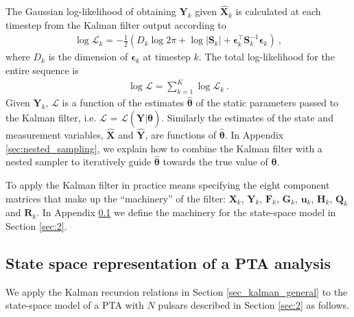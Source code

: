 \documentclass[fleqn,usenatbib,useAMS]{mnras}
\begin{document}
The Gaussian log-likelihood of obtaining ${\boldsymbol{Y}}_k$ given ${\boldsymbol{\hat X}}_k$ is calculated at each timestep from the Kalman filter output according to \citep{zarchan2000fundamentals}
\begin{eqnarray}
	\log \mathcal{L}_k =  -\frac{1}{2} \left (D_k \log 2 \pi + \log  \left | \boldsymbol{S}_k \right | + \boldsymbol{\epsilon}_k^{\intercal} \boldsymbol{S}_k^{-1}  \boldsymbol{\epsilon}_k \right ) \ ,
\end{eqnarray}
where $D_k$ is the dimension of $\boldsymbol{\epsilon}_k$ at timestep $k$. The total log-likelihood for the entire sequence is
\begin{eqnarray}
	\log \mathcal{L} =  \sum_{k=1}^{K} \log \mathcal{L}_k \ . \label{eq:likelihood}
\end{eqnarray}
Given ${\boldsymbol{Y}}_k$, $\mathcal{L}$ is a function of the estimates ${\boldsymbol{\hat \theta}}$ of the static parameters passed to the Kalman filter, i.e. $\mathcal{L}$ = $\mathcal{L}(\boldsymbol{Y} | \boldsymbol{\hat \theta})$. Similarly the estimates of the state and measurement variables, $\hat{\boldsymbol{X}}$ and $\hat{\boldsymbol{Y}}$, are functions of $\boldsymbol{\hat \theta}$. In Appendix \ref{sec:nested_sampling}, we explain how to combine the Kalman filter with a nested sampler to iteratively guide ${\boldsymbol{\hat \theta}}$ towards the true value of ${\boldsymbol{\theta}}$. \newline 

To apply the Kalman filter in practice means specifying the eight component matrices that make up the ``machinery'' of the filter: $\boldsymbol{X}_k$, $\boldsymbol{Y}_k$, $\boldsymbol{F}_k$, $\boldsymbol{G}_k$, $\boldsymbol{u}_k$, $\boldsymbol{H}_k$, $\boldsymbol{Q}_k$ and $\boldsymbol{R}_k$. In Appendix \ref{sec_kalman_specific} we define the machinery for the state-space model in Section \ref{sec:2}. 


\subsection{State space representation of a PTA analysis}\label{sec_kalman_specific}
We apply the Kalman recursion relations in Section \ref{sec_kalman_general} to the state-space model of a PTA with $N$ pulsars described in Section \ref{sec:2} as follows. \newline 
\end{document}
